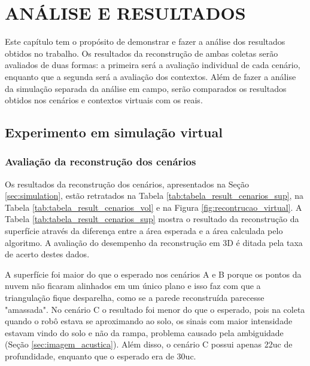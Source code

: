 
\chapter{ANÁLISE E RESULTADOS}
\label{chap:resultados}

Este capítulo tem o propósito de demonstrar e fazer a análise dos resultados obtidos no trabalho.
Os resultados da reconstrução de ambas coletas serão avaliados de duas formas: a primeira será a avaliação individual de cada cenário, enquanto que a segunda será a avaliação dos contextos.
Além de fazer a análise da simulação separada da análise em campo, serão comparados os resultados obtidos nos cenários e contextos virtuais com os reais.


\section{Experimento em simulação virtual}

\subsection{Avaliação da reconstrução dos cenários}
\label{sec:avaliacao_cenarios_simulacao}

Os resultados da reconstrução dos cenários, apresentados na Seção \ref{sec:simulation}, estão retratados na Tabela  \ref{tab:tabela_result_cenarios_sup}, na Tabela \ref{tab:tabela_result_cenarios_vol} e na Figura \ref{fig:recontrucao_virtual}.
A Tabela \ref{tab:tabela_result_cenarios_sup} mostra o resultado da reconstrução da superfície através da diferença entre a área esperada e a área calculada pelo algoritmo.
A avaliação do desempenho da reconstrução em 3D é ditada pela taxa de acerto destes dados.

A superfície foi maior do que o esperado nos cenários A e B porque os pontos da nuvem não ficaram alinhados em um único plano e isso faz com que a triangulação fique desparelha, como se a parede reconstruída parecesse "amassada".
No cenário C o resultado foi menor do que o esperado, pois na coleta quando o robô estava se aproximando ao solo, os sinais com maior intensidade estavam vindo do solo e não da rampa, problema causado pela ambiguidade (Seção \ref{sec:imagem_acustica}).
Além disso, o cenário C possui apenas 22uc de profundidade, enquanto que o esperado era de 30uc.


